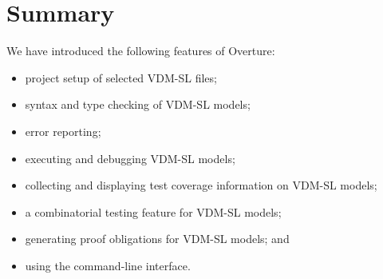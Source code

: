 \lstset{style=mystyle,language=VDM-SL}

\section{Summary}

We have introduced the following features of Overture:
\begin{itemize}
\item project setup of selected VDM-SL files;
\item syntax and type checking of VDM-SL models;
\item error reporting;
\item executing and debugging VDM-SL models; 
\item collecting and displaying test coverage information on VDM-SL
  models;
\item a combinatorial testing feature for VDM-SL models;
\item generating proof obligations for VDM-SL models; and
\item using the command-line interface. 
\end{itemize}



